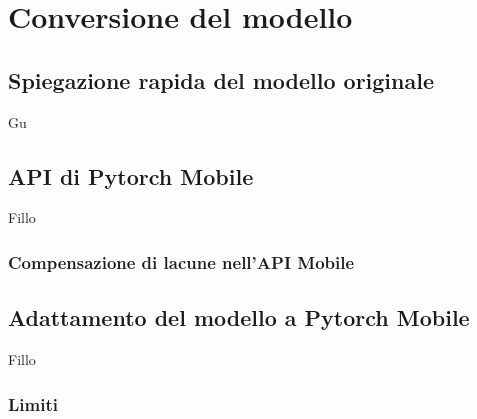 \chapter{Conversione del modello}

\section{Spiegazione rapida del modello originale}

Gu

\section{API di Pytorch Mobile}
Fillo


\subsection{Compensazione di lacune nell'API Mobile}


\section{Adattamento del modello a Pytorch Mobile}
Fillo

\subsection{Limiti}